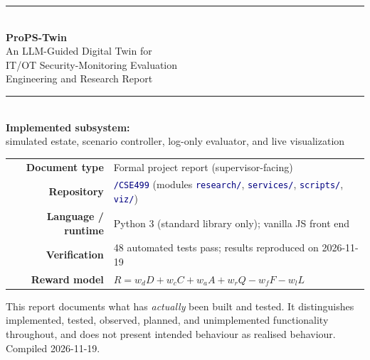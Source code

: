 \documentclass[11pt]{article}
\newcommand{\file}[1]{\textcolor{navy}{\texttt{\small #1}}}
\begin{document}
\begin{titlepage}
\centering
\vspace*{1.5cm}
{\color{navy}\rule{\linewidth}{1.4pt}}\\[10pt]
{\Huge\bfseries ProPS-Twin}\\[8pt]
{\LARGE An LLM-Guided Digital Twin for\\ IT/OT Security-Monitoring Evaluation}\\[10pt]
{\large Engineering and Research Report}\\[6pt]
{\color{navy}\rule{\linewidth}{1.4pt}}\\[1.4cm]

{\large\textbf{Implemented subsystem:}\\ simulated estate, scenario controller,
log-only evaluator, and live visualization}\\[1.2cm]

\begin{tabular}{rl}
\textbf{Document type} & Formal project report (supervisor-facing)\\[2pt]
\textbf{Repository} & \file{/CSE499} (modules \file{research/}, \file{services/}, \file{scripts/}, \file{viz/})\\[2pt]
\textbf{Language / runtime} & Python 3 (standard library only); vanilla JS front end\\[2pt]
\textbf{Verification} & 48 automated tests pass; results reproduced on 2026-11-19\\[2pt]
\textbf{Reward model} & $R=w_dD+w_cC+w_aA+w_rQ-w_fF-w_lL$\\
\end{tabular}

\vfill
{\small This report documents what has \emph{actually} been built and tested. It
distinguishes implemented, tested, observed, planned, and unimplemented
functionality throughout, and does not present intended behaviour as realised
behaviour.}\\[6pt]
{\small\color{gray}Compiled 2026-11-19.}
\end{titlepage}
\end{document}
